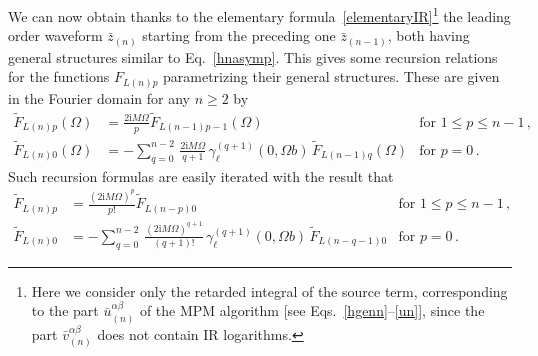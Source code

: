 \documentclass[prd,preprint,superscriptaddress,tightenlines,nofootinbib,
  eqsecnum,showpacs]{revtex4}
\newcommand{\ui}{\mathrm{i}}
\begin{document}
We can now obtain thanks to the elementary
formula~\eqref{elementaryIR}\footnote{Here we consider only the
  retarded integral of the source term, corresponding to the part
  $\bar{u}^{\alpha\beta}_{(n)}$ of the MPM algorithm [see
    Eqs.~\eqref{hgenn}--\eqref{un}], since the part
  $\bar{v}^{\alpha\beta}_{(n)}$ does not contain IR logarithms.} the
leading order waveform $\bar{z}_{(n)}$ starting from the preceding one
$\bar{z}_{(n-1)}$, both having general structures similar to
Eq.~\eqref{hnasymp}. This gives some recursion relations for the
functions $F_{L(n)p}$ parametrizing their general structures. These
are given in the Fourier domain for any $n\geqslant 2$ by
%
\begin{subequations}\label{recursion0}\begin{align}
\tilde{F}_{L(n)p}(\Omega) &= \frac{2\ui M \Omega
}{p}\tilde{F}_{L(n-1)p-1}(\Omega) &\text{for $1\leqslant
  p\leqslant n-1$}\,,\\ \tilde{F}_{L(n)0}(\Omega) &= - \sum_{q=0}^{n-2}
\,\frac{2\ui M \Omega }{q+1} \,\gamma_\ell^{(q+1)}(0,\Omega
b)\,\tilde{F}_{L(n-1)q}(\Omega) &\text{for $p=0$}\,.
\end{align}
\end{subequations}
%
Such recursion formulas are easily iterated with the result that
%
\begin{subequations}\label{recursion}\begin{align} 
\tilde{F}_{L(n)p} &= \frac{(2\ui M \Omega)^p}{p!}\tilde{F}_{L(n-p)0}
&\text{for $1\leqslant p\leqslant
  n-1$}\,,\label{recursiona}\\\tilde{F}_{L(n)0} &= - \sum_{q=0}^{n-2}
\,\frac{(2\ui M \Omega)^{q+1}}{(q+1)!}  \,\gamma_\ell^{(q+1)}(0,\Omega
b)\,\tilde{F}_{L(n-q-1)0} &\text{for $p=0$}\,.\label{recursionb}
\end{align}
\end{subequations}
%
\end{document}

